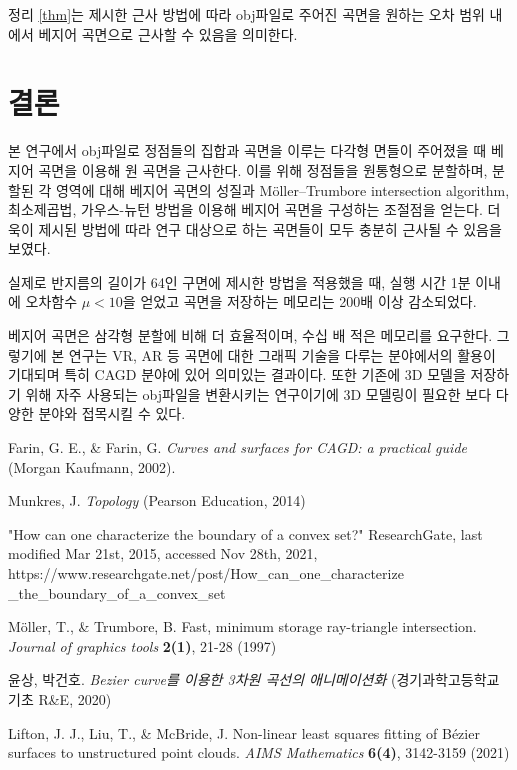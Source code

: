 \documentclass{Humantech_Paper_Awardfullpaper_hutech}
\begin{document}
정리 \ref{thm}는 제시한 근사 방법에 따라 obj파일로 주어진 곡면을 원하는 오차 범위 내에서 베지어 곡면으로 근사할 수 있음을 의미한다. 

\section{결론}
본 연구에서 obj파일로 정점들의 집합과 곡면을 이루는 다각형 면들이 주어졌을 때 베지어 곡면을 이용해 원 곡면을 근사한다. 이를 위해 정점들을 원통형으로 분할하며, 분할된 각 영역에 대해 베지어 곡면의 성질과 Möller–Trumbore intersection algorithm, 최소제곱법, 가우스-뉴턴 방법을 이용해 베지어 곡면을 구성하는 조절점을 얻는다. 더욱이 제시된 방법에 따라 연구 대상으로 하는 곡면들이 모두 충분히 근사될 수 있음을 보였다.

실제로 반지름의 길이가 64인 구면에 제시한 방법을 적용했을 때, 실행 시간 1분 이내에 오차함수 $\mu < 10$을 얻었고 곡면을 저장하는 메모리는 200배 이상 감소되었다. 

베지어 곡면은 삼각형 분할에 비해 더 효율적이며, 수십 배 적은 메모리를 요구한다. 그렇기에 본 연구는 VR, AR 등 곡면에 대한 그래픽 기술을 다루는 분야에서의 활용이 기대되며 특히 CAGD 분야에 있어 의미있는 결과이다. 또한 기존에 3D 모델을 저장하기 위해 자주 사용되는 obj파일을 변환시키는 연구이기에 3D 모델링이 필요한 보다 다양한 분야와 접목시킬 수 있다. 

\begin{thebibliography}{99}
	 Farin, G. E., \& Farin, G. \emph{Curves and surfaces for CAGD: a practical guide} (Morgan Kaufmann, 2002).
	
	 Munkres, J. \emph{Topology} (Pearson Education, 2014)
	
	 "How can one characterize the boundary of a convex set?" ResearchGate, last modified Mar 21st, 2015, accessed Nov 28th, 2021, https://www.researchgate.net/post/How\_can\_one\_characterize \_the\_boundary\_of\_a\_convex\_set
		
	 Möller, T., \& Trumbore, B. Fast, minimum storage ray-triangle intersection. \emph{Journal of graphics tools} \textbf{2(1)}, 21-28 (1997)
		
	 윤상, 박건호. \emph{Bezier curve를 이용한 3차원 곡선의 애니메이션화} (경기과학고등학교 기초 R\&E, 2020)
		
	 Lifton, J. J., Liu, T., \& McBride, J. Non-linear least squares fitting of Bézier surfaces to unstructured point clouds. \emph{AIMS Mathematics} \textbf{6(4)}, 3142-3159 (2021)
\end{thebibliography}
	
\end{document}
